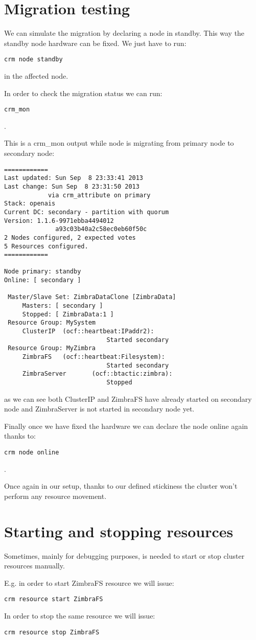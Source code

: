 \section {Migration testing}
We can simulate the migration by declaring a node in standby. This way the standby node hardware can be fixed. We just have to run:
\begin{verbatim}
crm node standby
\end{verbatim}
in the affected node.

In order to check the migration status we can run:
\begin{verbatim}
crm_mon
\end{verbatim}
.

This is a crm\_mon output while node is migrating from primary node to secondary node:
\begin{verbatim}
============
Last updated: Sun Sep  8 23:33:41 2013
Last change: Sun Sep  8 23:31:50 2013
            via crm_attribute on primary
Stack: openais
Current DC: secondary - partition with quorum
Version: 1.1.6-9971ebba4494012
              a93c03b40a2c58ec0eb60f50c
2 Nodes configured, 2 expected votes
5 Resources configured.
============

Node primary: standby
Online: [ secondary ]

 Master/Slave Set: ZimbraDataClone [ZimbraData]
     Masters: [ secondary ]
     Stopped: [ ZimbraData:1 ]
 Resource Group: MySystem
     ClusterIP  (ocf::heartbeat:IPaddr2):
                            Started secondary
 Resource Group: MyZimbra
     ZimbraFS   (ocf::heartbeat:Filesystem):
                            Started secondary
     ZimbraServer       (ocf::btactic:zimbra):
                            Stopped
\end{verbatim}
as we can see both ClusterIP and ZimbraFS have already started on secondary node and ZimbraServer is not started in secondary node yet.


Finally once we have fixed the hardware we can declare the node online again thanks to:
\begin{verbatim}
crm node online
\end{verbatim}
.

Once again in our setup, thanks to our defined stickiness the cluster won't perform any resource movement.

\section {Starting and stopping resources}
Sometimes, mainly for debugging purposes, is needed to start or stop cluster resources manually.

E.g. in order to start ZimbraFS resource we will issue:
\begin{verbatim}
crm resource start ZimbraFS
\end{verbatim}
In order to stop the same resource we will issue:
\begin{verbatim}
crm resource stop ZimbraFS
\end{verbatim}


